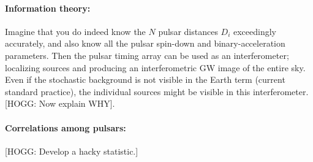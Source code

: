 \documentclass{article}
\begin{document}
\paragraph{Information theory:}
Imagine that you do indeed know the $N$ pulsar distances $D_i$ exceedingly accurately, and also know all the pulsar spin-down and binary-acceleration parameters.
Then the pulsar timing array can be used as an interferometer; localizing sources and producing an interferometric GW image of the entire sky.
Even if the stochastic background is not visible in the Earth term (current standard practice), the individual sources might be visible in this interferometer.
[HOGG: Now explain WHY].

\paragraph{Correlations among pulsars:}
[HOGG: Develop a hacky statistic.]
\end{document}
